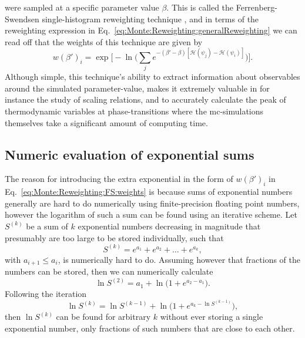 were sampled at a specific parameter value $\beta$. This is called the Ferrenberg-Swendsen single-histogram reweighting technique \cite{FS_1988}, and in terms of the reweighting
expression in Eq.~\eqref{eq:Monte:Reweighting:generalReweighting} we can read off that the weights of this technique are given by
\begin{equation}
    \label{eq:Monte:Reweighting:FS:weights}
    w(\beta')_i = \exp\Big[-\ln\Big(\sum_je^{-(\beta'-\beta)[\mathcal{H}(\psi_j)-\mathcal{H}(\psi_i)]}\Big)\Big].
\end{equation}
Although simple, this technique's ability to extract information about observables around the simulated parameter-value, makes it extremely valuable 
in for instance the study of scaling relations, and to accurately calculate the peak of thermodynamic variables at phase-transitions where the \ac{mc}-simulations themselves take a significant
amount of computing time.

\subsection{Numeric evaluation of exponential sums}
\label{sec:Monte:Reweighting:expSums}

The reason for introducing the extra exponential in the form of $w(\beta')_i$ in Eq.~\eqref{eq:Monte:Reweighting:FS:weights} is because sums of exponential
numbers generally are hard to do numerically using finite-precision
floating point numbers, however the logarithm of such a sum can be found using an iterative scheme. Let $S^{(k)}$ be a sum of $k$
exponential numbers decreasing in magnitude that presumably are too large to be stored individually, such that
\begin{equation}
    \label{eq:Monte:Reweighting:FS:expSum}
    S^{(k)} = e^{a_1} + e^{a_2} + \ldots + e^{a_k},
\end{equation}
with $a_{i+1}\leq a_i$, is numerically hard to do. Assuming however that fractions of the numbers can be stored, then we can numerically calculate
\begin{equation}
    \label{eq:Monte:Reweighting:FS:initialLnSum}
    \ln S^{(2)} = a_1 + \ln\Big(1+e^{a_2-a_1}\Big).
\end{equation}
Following the iteration
\begin{equation}
    \label{eq:Monte:Reweighting:FS:iteratedLnSum}
    \ln S^{(k)} = \ln S^{(k-1)} + \ln\Big(1+e^{a_k-\ln S^{(k-1)}}\Big),
\end{equation}
then $\ln S^{(k)}$ can be found for arbitrary $k$ without ever storing a single exponential number, only fractions of such numbers that are close to each other.


